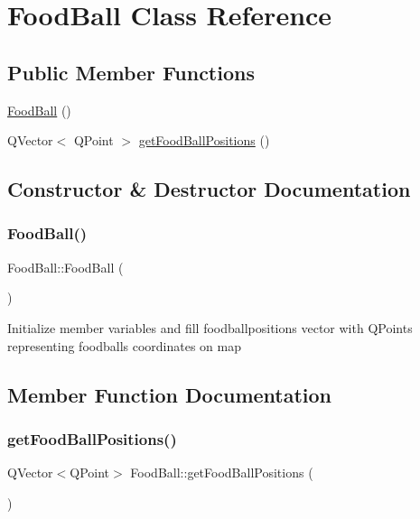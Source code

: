 \hypertarget{class_food_ball}{}\section{Food\+Ball Class Reference}
\label{class_food_ball}
\subsection*{Public Member Functions}
\begin{DoxyCompactItemize}
\item 
\mbox{\hyperlink{class_food_ball_accba761984d128bead135b3864a63ed0}{Food\+Ball}} ()
\item 
Q\+Vector$<$ Q\+Point $>$ \mbox{\hyperlink{class_food_ball_a8426b37d22df239e9f605a4c5fae189a}{get\+Food\+Ball\+Positions}} ()
\end{DoxyCompactItemize}


\subsection{Constructor \& Destructor Documentation}
\mbox{\label{class_food_ball_accba761984d128bead135b3864a63ed0}} 
\subsubsection{\texorpdfstring{Food\+Ball()}{FoodBall()}}
{\footnotesize\ttfamily Food\+Ball\+::\+Food\+Ball (\begin{DoxyParamCaption}{ }\end{DoxyParamCaption})}

Initialize member variables and fill foodballpositions vector with Q\+Points representing foodballs coordinates on map 

\subsection{Member Function Documentation}
\mbox{\label{class_food_ball_a8426b37d22df239e9f605a4c5fae189a}} 
\subsubsection{\texorpdfstring{get\+Food\+Ball\+Positions()}{getFoodBallPositions()}}
{\footnotesize\ttfamily Q\+Vector$<$Q\+Point$>$ Food\+Ball\+::get\+Food\+Ball\+Positions (\begin{DoxyParamCaption}{ }\end{DoxyParamCaption})\hspace{0.3cm}{\ttfamily [inline]}}


